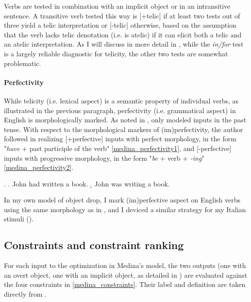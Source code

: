 Verbs are tested in combination with an implicit object or in an intransitive sentence. A transitive verb tested this way is [+telic] if at least two tests out of three yield a telic interpretation or [-telic] otherwise, based on the assumption that the verb lacks telic denotation (i.e. is atelic) if it can elicit both a telic and an atelic interpretation. As I will discuss in more detail in , while the \textit{in/for} test is a largely reliable diagnostic for telicity, the other two tests are somewhat problematic.


\paragraph{Perfectivity} While telicity (i.e. lexical aspect) is a semantic property of individual verbs, as illustrated in the previous paragraph, perfectivity (i.e. grammatical aspect) in English is morphologically marked. As noted in , \textcite{Medina2007} only modeled inputs in the past tense. With respect to the morphological markers of (im)perfectivity, the author followed \textcite{Olsen1997} in realizing [+perfective] inputs with perfect morphology, in the form "\textit{have} + past participle of the verb" \ref{medina_perfectivity1}, and [-perfective] inputs with progressive morphology, in the form "\textit{be} + verb + \textit{-ing}" \ref{medina_perfectivity2}.

\ex. \label{medina_perfectivity} \a. \label{medina_perfectivity1} John had written a book.
\b. \label{medina_perfectivity2}  John was writing a book.

In my own model of object drop, I mark (im)perfective aspect on English verbs using the same morphology as in \textcite{Medina2007}, and I deviced a similar strategy for my Italian stimuli ().


\subsection{Constraints and constraint ranking} 

For each input to the optimization in Medina's model, the two outputs (one with an overt object, one with an implicit object, as detailed in ) are evaluated against the four constraints in \ref{medina_constraints}. Their label and definition are taken directly from \textcite[72]{Medina2007}.


